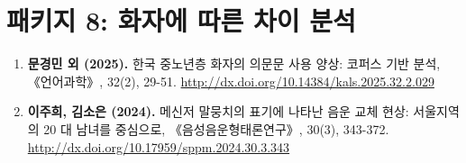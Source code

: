 \documentclass[twoside,openright]{report}
\newcommand{\da}[1]{{\small{《#1》}}}
\begin{document}
\section*{패키지 8: 화자에 따른 차이 분석}

\begin{enumerate}[label=\textbf{\arabic*.}] %

  \item \textbf{문경민 외 (2025).} 한국 중노년층 화자의 의문문 사용 양상: 코퍼스 기반 분석, \da{언어과학}, 32(2), 29-51. \href{http://dx.doi.org/10.14384/kals.2025.32.2.029}{http://dx.doi.org/10.14384/kals.2025.32.2.029}
  

  \item \textbf{이주희, 김소은 (2024).} 메신저 말뭉치의 표기에 나타난 음운 교체 현상: 서울지역의 20 대 남녀를 중심으로, \da{음성음운형태론연구}, 30(3), 343-372. \href{http://dx.doi.org/10.17959/sppm.2024.30.3.343}{http://dx.doi.org/10.17959/sppm.2024.30.3.343}
  

\end{enumerate}
\end{document}
